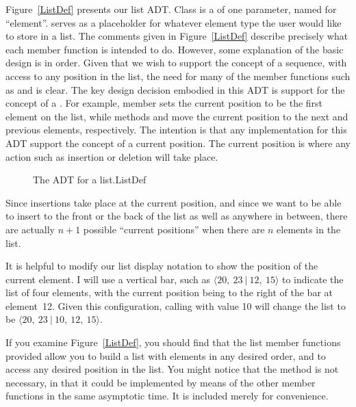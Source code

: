 Figure~\ref{ListDef} presents our list ADT.
Class  is
a 
of one parameter, named  for ``element''.
 serves as a placeholder for
whatever element type the user would like to store in a list.
The comments given in Figure~\ref{ListDef} describe precisely what
each member function is intended to do.
However, some explanation of the basic design is in order.
Given that we wish to support the concept of a sequence, with access
to any position in the list, the need for many of the member
functions such as  and  is clear.
The key design decision embodied in this ADT is support for the
concept of a .
For example, member  sets
the current position to be the first element on the list, while
methods  and  move the current position
to the next and previous elements, respectively.
The intention is that any implementation for this ADT support the
concept of a current position.
The current position is where any action such as insertion or deletion
will take place.

\begin{figure}
\vspace{-\bigskipamount}
{The ADT for a list.}{ListDef}
\end{figure}

Since insertions take place at the current position, and since we want
to be able to insert to the front or the back of the list as well as
anywhere in between, there are actually \(n+1\) possible ``current
positions'' when there are \(n\) elements in the list.

It is helpful to modify our list display notation to show the position
of the current element.
I will use a vertical bar, such as
\(\langle 20,\ 23\ |\ 12,\ 15\rangle\)
to indicate the list of four elements,
with the current position being to the right of the bar at element~12.
Given this configuration, calling  with value 10
will change the list to be \(\langle 20,\ 23\ |\ 10,\ 12,\ 15\rangle\).

If you examine Figure~\ref{ListDef}, you should find that the list
member functions provided allow you to build a list with elements in
any desired order, and to access any desired position in the list.
You might notice that the  method is not
necessary, in that it could be implemented by means of the other
member functions in the same asymptotic time.
It is included merely for convenience.

